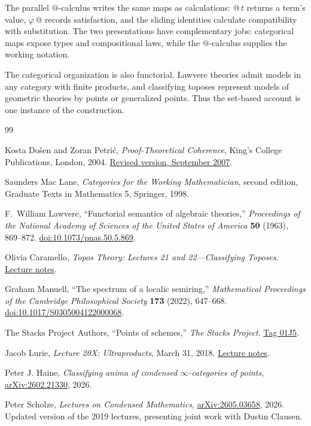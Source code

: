 \documentclass[11pt]{article}
\makeatletter
\newcommand{\atsign}{\mathord{@}}
\makeatother
\begin{document}
The parallel $\atsign$-calculus writes the same maps as calculations:
$\atsign\,t$ returns a term's value, \(\varphi\,\atsign\) records satisfaction,
and the sliding identities calculate compatibility with substitution. The two
presentations have complementary jobs: categorical maps expose types and compositional
laws, while the $\atsign$-calculus supplies the working notation.

The categorical organization is also functorial. Lawvere theories admit models
in any category with finite products, and classifying toposes represent models
of geometric theories by points or generalized points. Thus the set-based
account is one instance of the construction.

{\footnotesize
\begin{thebibliography}{99}
\setlength{\itemsep}{0pt}
\setlength{\parsep}{0pt}

Kosta Do\v{s}en and Zoran Petri\'{c},
\emph{Proof-Theoretical Coherence}, King's College Publications,
London, 2004.
\href{https://www.mi.sanu.ac.rs/novi_sajt/biography/kosta/coh.pdf}
{Revised version, September 2007}.

Saunders Mac Lane,
\emph{Categories for the Working Mathematician}, second edition,
Graduate Texts in Mathematics 5, Springer, 1998.

F.~William Lawvere,
``Functorial semantics of algebraic theories,''
\emph{Proceedings of the National Academy of Sciences of the United States of
America} \textbf{50} (1963), 869--872.
\href{https://doi.org/10.1073/pnas.50.5.869}{doi:10.1073/pnas.50.5.869}.

Olivia Caramello,
\emph{Topos Theory: Lectures 21 and 22---Classifying Toposes}.
\href{https://www.oliviacaramello.com/Teaching/CambridgeToposTheoryCourseLectures21and22.pdf}{Lecture notes}.

Graham Manuell,
``The spectrum of a localic semiring,''
\emph{Mathematical Proceedings of the Cambridge Philosophical Society}
\textbf{173} (2022), 647--668.
\href{https://doi.org/10.1017/S0305004122000068}{doi:10.1017/S0305004122000068}.

The Stacks Project Authors,
``Points of schemes,'' \emph{The Stacks Project}.
\href{https://stacks.math.columbia.edu/tag/01J5}{Tag 01J5}.

Jacob Lurie,
\emph{Lecture 20X: Ultraproducts}, March 31, 2018.
\href{https://www.math.ias.edu/~lurie/278xnotes/Lecture20X-Ultraproducts.pdf}
{Lecture notes}.

Peter J. Haine,
\emph{Classifying anima of condensed \(\infty\)-categories of points},
\href{https://arxiv.org/abs/2602.21330}{arXiv:2602.21330}, 2026.

Peter Scholze,
\emph{Lectures on Condensed Mathematics},
\href{https://arxiv.org/abs/2605.03658}{arXiv:2605.03658}, 2026.
Updated version of the 2019 lectures, presenting joint work with
Dustin Clausen.

\end{thebibliography}
}
\end{document}
